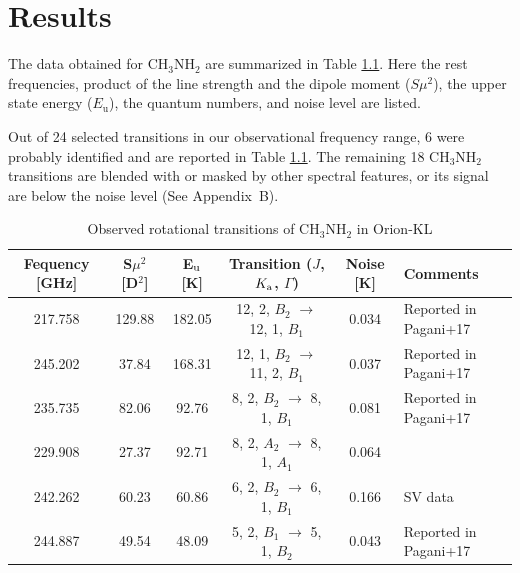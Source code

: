 \chapter{Results
  \label{chap:result}}

The data obtained for CH$_{3}$NH$_{2}$ are summarized in Table \ref{tab:MAOri}.
Here the rest frequencies, product of the line strength and the dipole moment ($S\mu^2$), the upper state energy ($E_{\mathrm{u}}$), the quantum numbers, and noise level are listed.

Out of 24 selected transitions in our observational frequency range, 
6 were probably identified and are reported in Table \ref{tab:MAOri}. 
The remaining 18 CH$_{3}$NH$_{2}$ transitions are blended with or masked by other spectral features, 
or its signal are below the noise level (See Appendix~B). 

\renewcommand{\arraystretch}{1.5}
\begin{table}[htb]
\begin{center}

  \caption{Observed rotational transitions of CH$_3$NH$_2$ in Orion-KL}
  \label{tab:MAOri}
{\scriptsize
  \begin{tabular}{cccccl} \hline
   Fequency [GHz]& S$\mu ^{2}$ [D$^2$] & E$_{\rm{u}}$ [K]& Transition ($J$, $K_{\rm{a}}$, $\Gamma$) & Noise [K]  &Comments \\ \hline 
    217.758 & 129.88 & 182.05 & 12, 2, $B_{2}$ $\rightarrow$ 12, 1, $B_{1}$ &  0.034 &Reported in Pagani+17 \\
    245.202 & 37.84 & 168.31 & 12, 1, $B_{2}$ $\rightarrow$ 11, 2, $B_{1}$ & 0.037 &Reported in Pagani+17 \\
    235.735 & 82.06 & 92.76 & 8, 2, $B_{2}$ $\rightarrow$ 8, 1, $B_{1}$ &  0.081 &Reported in Pagani+17 \\
    229.908 & 27.37 & 92.71 & 8, 2, $A_{2}$ $\rightarrow$ 8, 1, $A_{1}$ & 0.064&\\ 
    242.262 & 60.23 & 60.86 & 6, 2, $B_{2}$ $\rightarrow$ 6, 1, $B_{1}$ &  0.166 &SV data \\
    244.887 & 49.54 & 48.09 & 5, 2, $B_{1}$ $\rightarrow$ 5, 1, $B_{2}$ & 0.043 &Reported in Pagani+17 \\ \hline
  \end{tabular}
  }
\end{center}
\end{table}

